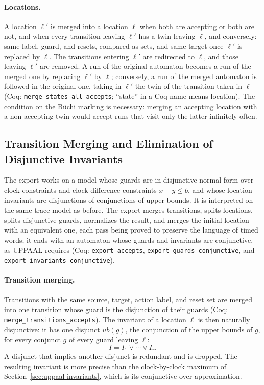 \paragraph{Locations.}
A location $\ell'$ is merged into a location $\ell$ when both are accepting or
both are not, and when every transition leaving $\ell'$ has a twin leaving
$\ell$, and conversely: same label, guard, and resets, compared as sets, and
same target once $\ell'$ is replaced by $\ell$.  The transitions entering
$\ell'$ are redirected to $\ell$, and those leaving $\ell'$ are removed.  A run
of the original automaton becomes a run of the merged one by replacing $\ell'$
by $\ell$; conversely, a run of the merged automaton is followed in the
original one, taking in $\ell'$ the twin of the transition taken in $\ell$
(Coq: \texttt{merge\_\allowbreak{}states\_\allowbreak{}all\_\allowbreak{}accepts}; ``state'' in a Coq name
means location).  The condition on the B\"uchi marking is necessary: merging
an accepting location with a non-accepting twin would accept runs that visit only the latter infinitely
often.


\subsection{Transition Merging and Elimination of Disjunctive Invariants}
\label{subsec:disjunctive-invariants}

The export works on a model whose guards are in disjunctive normal form over
clock constraints and clock-difference constraints $x-y\le b$, and whose
location invariants are disjunctions of conjunctions of upper bounds.  It is
interpreted on the same trace model as before.  The export merges
transitions, splits locations, splits disjunctive guards, normalizes the
result, and merges the initial location with an equivalent one, each pass
being proved to preserve the language of timed words; it
ends with an
automaton whose guards and invariants are conjunctive, as UPPAAL requires
(Coq: \texttt{export\_\allowbreak{}accepts},
\texttt{export\_\allowbreak{}guards\_\allowbreak{}conjunctive}, and
\texttt{export\_\allowbreak{}invariants\_\allowbreak{}conjunctive}).

\paragraph{Transition merging.}
Transitions with the same source, target, action label, and reset set are
merged into one transition whose guard is the disjunction of their guards (Coq:
\texttt{merge\_\allowbreak{}transitions\_\allowbreak{}accepts}).  The invariant of a location
$\ell$ is then naturally disjunctive: it has one disjunct
$\mathit{ub}(g)$, the conjunction of the upper bounds of $g$, for every
conjunct $g$ of every guard leaving $\ell$:
\[
  I = I_1 \lor \cdots \lor I_r.
\]
A disjunct that implies another disjunct is redundant and is dropped.  The
resulting invariant is more precise than the clock-by-clock maximum of
Section~\ref{sec:uppaal-invariants}, which is its conjunctive
over-approximation.

